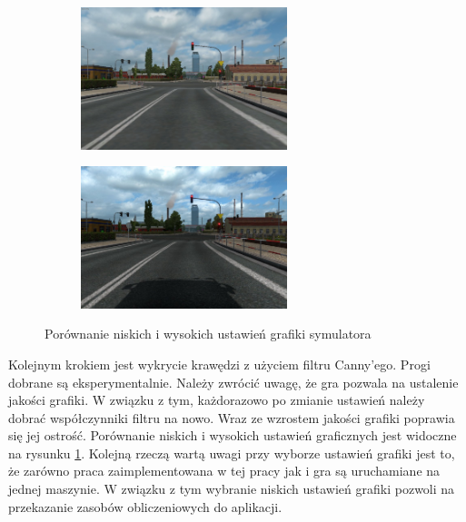 \begin{figure}[h]
	\centering
	\begin{subfigure}{0.35\textwidth}
		\centering
		\includegraphics[width=6cm]{img/low_details.jpg}
		\subcaption{\label{fig:low_details}}
	\end{subfigure}
	\begin{subfigure}{0.35\textwidth}
		\centering
		\includegraphics[width=6cm]{img/high_details.jpg}
		\subcaption{\label{fig:high_details}}
	\end{subfigure}
	
	\caption{\label{fig:details1}Porównanie niskich \protect{} i wysokich \protect{} ustawień grafiki symulatora}
\end{figure}

Kolejnym krokiem jest wykrycie krawędzi z użyciem filtru Canny'ego. 
Progi dobrane są eksperymentalnie. %
Należy zwrócić uwagę, że gra pozwala na ustalenie jakości grafiki. 
W związku z tym, każdorazowo po zmianie ustawień należy dobrać współczynniki filtru na nowo. 
Wraz ze wzrostem jakości grafiki poprawia się jej ostrość. %
Porównanie niskich i wysokich ustawień graficznych jest widoczne na rysunku \ref{fig:details1}. %
Kolejną rzeczą wartą uwagi przy wyborze ustawień grafiki jest to, że zarówno praca zaimplementowana w tej pracy jak i gra są uruchamiane na jednej maszynie. %
W związku z tym wybranie niskich ustawień grafiki pozwoli na przekazanie zasobów obliczeniowych do aplikacji.

